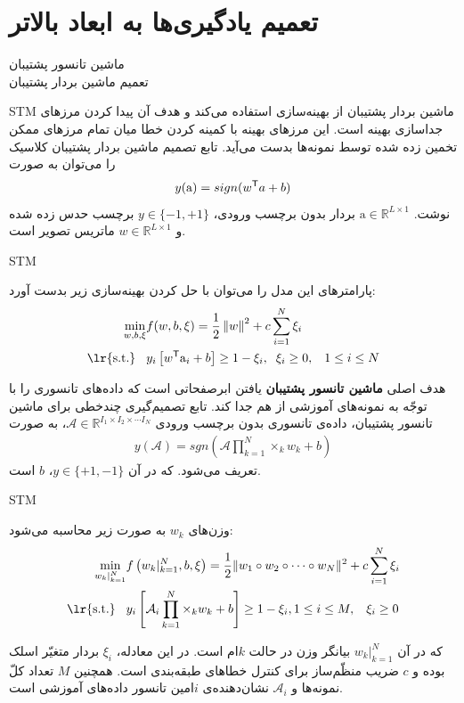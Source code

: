 \section{ تعمیم یادگیری‌ها به ابعاد بالاتر}
\begin{frame}[standout]
ماشین تانسور پشتیبان 
\\
\small{ تعمیم ماشین بردار پشتیبان}
\end{frame}
\begin{frame}{STM}
\small{
ماشین بردار پشتیبان از بهینه‌سازی استفاده می‌کند و  هدف آن پیدا کردن مرزهای جداسازی بهینه است. این مرز‌های بهینه با کمینه کردن خطا میان تمام مرز‌های ممکن تخمین زده شده توسط نمونه‌ها بدست می‌آید. تابع تصمیم ماشین بردار پشتیبان کلاسیک را می‌توان به صورت 
\[y(\mathrm{a}) = sign(w^{\mathsf{T}} a + b)\]
نوشت. 
$\mathrm{a}\in \mathbb{R}^{L \times 1}$
بردار بدون برچسب ورودی، 
$y \in \{ -1,+1 \}$ برچسب حدس زده شده و
$w \in \mathbb{R}^{L \times 1}$
ماتریس تصویر است. 
}
\end{frame}
\begin{frame}{STM}
\small{
پارامتر‌های این مدل را می‌توان با حل کردن بهینه‌سازی زیر بدست آورد: 
\begin{align*}
\underset{w,b,\xi}{\min} &f(w,b,\xi) =  \frac{1}{2}\norm{w}^2 + c\sum_{i=1}^{N} \xi_i  \notag \\  
\text{\lr{s.t.}}\hspace{3mm} &y_i \left[ w^\trans \mathrm{a}_i + b \right] \geq 1 - \xi_i,\hspace{2mm}\xi_i \geq 0, \hspace{3mm} 1\leq i\leq N
\end{align*}


هدف اصلی  
\textbf{ماشین تانسور پشتیبان}
یافتن ابرصفحاتی است که داده‌های تانسوری را با توجّه به نمونه‌های آموزشی از هم جدا کند. تابع تصمیم‌گیری چندخطی برای ماشین تانسور پشتیبان،
 داده‌ی تانسوری بدون برچسب ورودی 
 \linebreak 
$\mathcal{A} \in \mathbb{R}^{I_1 \times I_2 \times \cdots I_N}$،
به صورت 
\begin{align*}
y(\mathcal{A}) = sgn \left(  \mathcal{A} \prod_{k=1}^{N} \times_k w_k + b \right)
\end{align*}
تعریف  می‌شود. که در آن 
$y \in \{ +1,-1 \}$،
$b$
است.
}
\end{frame}
\begin{frame}{STM}
\small{
	وزن‌های
$w_k$
 به صورت زیر محاسبه می‌شود: 
\begin{align}\label{STM_Primal}
\underset{w_k |_{k=1}^{N}}{\min} &f\left( w_k |_{k=1}^{N}, b, \xi\right) = \frac{1}{2} \|{ w_1 \circ w_2 \circ \cdots \circ w_N }\|^2 + c\sum_{i=1}^{N} \xi_i\\
\text{\lr{s.t.}}\hspace{3mm} & y_i \left[ \mathcal{A}_i \prod_{k=1}^{N} \times_k w_k + b \right] \geq 1 - \xi_i, 1\leq i\leq M , \hspace{3mm}\xi_i \geq 0 \notag
\end{align}

\pause
که در آن 
$w_k |_{k=1}^{N}$
 بیانگر وزن در حالت 
$k$ام
است. در این معادله، 
$\xi_i$
بردار متغیّر اسلک بوده و 
$c$
ضریب منظّم‌ساز برای کنترل خطا‌های طبقه‌بندی است. همچنین 
$M$
تعداد کلّ نمونه‌ها و 
$\mathcal{A}_i$ 
نشان‌دهنده‌ی 
$i$امین
تانسور داده‌های آموزشی است. 
}
\end{frame}
